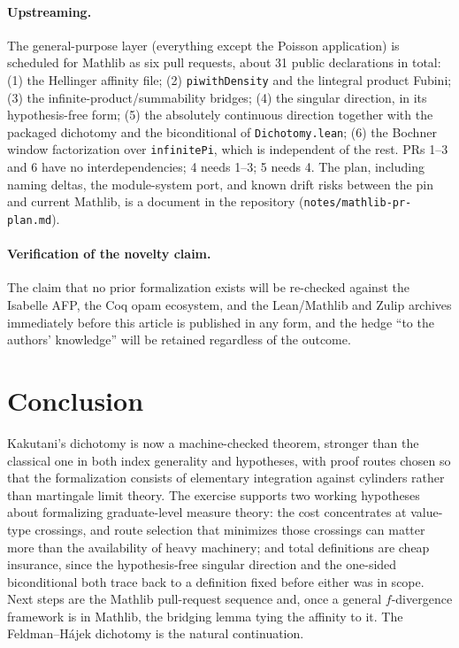 \documentclass[a4paper,UKenglish,autoref,thm-restate]{lipics-v2021}
\newcommand{\leanid}[1]{{\def\_{\textunderscore\allowbreak}\texttt{#1}}}
\begin{document}
\paragraph*{Upstreaming.} The general-purpose layer (everything except the
Poisson application) is scheduled for Mathlib as six pull requests, about 31
public declarations in total: (1) the Hellinger affinity file; (2)
\leanid{pi\_withDensity} and the lintegral product Fubini; (3) the
infinite-product/summability bridges; (4) the singular direction, in its
hypothesis-free form; (5)
the absolutely continuous direction together with the packaged dichotomy and
the biconditional of \texttt{Dichotomy.lean}; (6) the Bochner window
factorization over \leanid{infinitePi}, which is independent of the rest.
PRs 1--3 and 6 have no interdependencies; 4 needs 1--3; 5 needs 4. The plan,
including naming deltas, the module-system port, and known drift risks
between the pin and current Mathlib, is a document in the repository
(\texttt{notes/}\allowbreak\texttt{mathlib-pr-plan.md}).

\paragraph*{Verification of the novelty claim.} The claim that no prior
formalization exists will be re-checked against the Isabelle AFP, the Coq
opam ecosystem, and the Lean/Mathlib and Zulip archives immediately before
this article is published in any form, and the hedge ``to the authors'
knowledge'' will be retained regardless of the outcome.

\section{Conclusion}
\label{sec:conclusion}

Kakutani's dichotomy is now a machine-checked theorem, stronger than the
classical one in both index generality and hypotheses, with proof routes
chosen so that the formalization consists of elementary integration against
cylinders rather than martingale limit theory. The exercise supports two
working hypotheses about formalizing graduate-level measure theory: the cost
concentrates at value-type crossings, and route selection that minimizes
those crossings can matter more than the availability of heavy machinery;
and total definitions are cheap insurance, since the hypothesis-free singular
direction and the one-sided biconditional both trace back to a definition
fixed before either was in scope. Next steps are the Mathlib pull-request
sequence and, once a general $f$-divergence framework is in Mathlib, the
bridging lemma tying the affinity to it. The Feldman--H\'ajek dichotomy is
the natural continuation.


\end{document}
